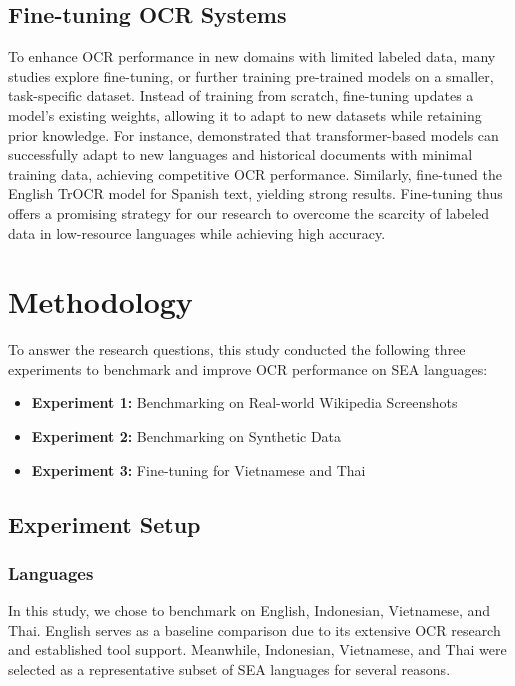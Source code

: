 \documentclass[12pt,oneside]{memoir}
\begin{document}
\section{Fine-tuning OCR Systems}

To enhance OCR performance in new domains with limited labeled data, many studies explore fine-tuning, or further training pre-trained models on a smaller, task-specific dataset. 
Instead of training from scratch, fine-tuning updates a model's existing weights, allowing it to adapt to new datasets while retaining prior knowledge. 
For instance, \textcite{parres-and-paredes-2023} demonstrated that transformer-based models can successfully adapt to new languages and historical documents with minimal training data, achieving competitive OCR performance.
Similarly, \textcite{laurent-and-lauar-2024} fine-tuned the English TrOCR model for Spanish text, yielding strong results.
Fine-tuning thus offers a promising strategy for our research to overcome the scarcity of labeled data in low-resource languages while achieving high accuracy.

\chapter{Methodology}

To answer the research questions, this study conducted the following three experiments to benchmark and improve OCR performance on SEA languages:

\begin{itemize}
    \item \textbf{Experiment 1:} Benchmarking on Real-world Wikipedia Screenshots
    \item \textbf{Experiment 2:} Benchmarking on Synthetic Data
    \item \textbf{Experiment 3:} Fine-tuning for Vietnamese and Thai
\end{itemize}

\section{Experiment Setup}

\subsection{Languages}

In this study, we chose to benchmark on English, Indonesian, Vietnamese, and Thai. English serves as a baseline comparison due to its extensive OCR research and established tool support. Meanwhile, Indonesian, Vietnamese, and Thai were selected as a representative subset of SEA languages for several reasons.
\end{document}
